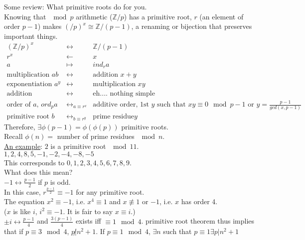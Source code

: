   Some review: What primitive roots do for you.\\
  Knowing that $\mod p$ arithmetic ($\mathbb{Z}/p$) has a primitive root, $r$
  (an element of order $p-1$) makes $(\mathbb/p)^x \cong \mathbb{Z}/(p-1)$, a
  renaming or bijection that preserves important things.\\
  \begin{eqnarray*}
    (\mathbb{Z}/p)^x & \leftrightarrow & \mathbb{Z}/(p-1) \\
    r^x & \gets & x\\
    a &\mapsto & ind_r{a}\\
    \text{multiplication }ab & \leftrightarrow & \text{addition }x+y\\
    \text{exponentiation }a^y & \leftrightarrow & \text{multiplication }xy\\
    \text{addition} & \leftrightarrow & \text{eh.... nothing simple} \\
    \text{order of $a$, $ord_p a$} & \leftrightarrow_{a \equiv r^x}& \text{additive
    order, 1st $y$ such that $xy \equiv 0 \mod p-1$ or $y = 
    \frac{p-1}{gcd(x,p-1)}$}\\
    \text{primitive root $b$} &\leftrightarrow_{b \equiv r^y}& \text{prime 
    residue}y
  \end{eqnarray*}
  Therefore, $\exists \phi(p-1) = \phi(\phi(p))$ primitive roots.\\
  Recall $\phi(n) = $ number of prime residues $\mod n$.\\
  \underline{An example}: $2$ is a primitive root $\mod 11$.\\
  $1, 2, 4, 8, 5, -1, -2, -4, -8, -5$\\
  This corresponds to $0, 1, 2, 3, 4, 5, 6, 7, 8, 9$.\\
  What does this mean?\\
  $-1 \leftrightarrow \frac{p-1}{2}$ if $p$ is odd.\\
  In this case, $r^{\frac{p-1}{2}} \equiv -1$ for any primitive root.\\
  The equation $x^2 \equiv -1$, i.e. $x^4 \equiv 1$ and $x \not\equiv 1$ or $-1$,
  i.e. $x$ has order 4.\\
  ($x$ is like $i$, $i^2  \equiv -1$. It is fair to say $x \equiv i$.)\\
  $\pm i \leftrightarrow \frac{p-1}{4}$ and $\frac{3(p-1)}{4}$ exists iff $\equiv 1 \mod 4$. primitive root theorem thus implies that if $p \equiv 3 \mod 4$, $p \not| n^2 + 1$. If $p \equiv 1 \mod 4$, $\exists n$ such that $p \equiv 1 \exists
  p | n^2 + 1$
